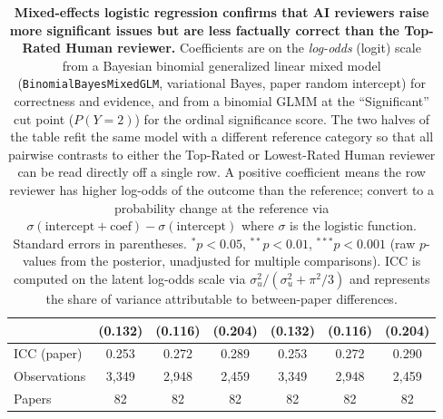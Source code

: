 \begin{table}[t]
\begin{tabular}{l ccc ccc}
                     & {\scriptsize (0.132)} & {\scriptsize (0.116)} & {\scriptsize (0.204)} & {\scriptsize (0.132)} & {\scriptsize (0.116)} & {\scriptsize (0.204)} \\
\midrule
ICC (paper)          & 0.253          & 0.272          & 0.289          & 0.253          & 0.272          & 0.290          \\
Observations         & 3{,}349        & 2{,}948        & 2{,}459        & 3{,}349        & 2{,}948        & 2{,}459        \\
Papers               & 82             & 82             & 82             & 82             & 82             & 82             \\
\bottomrule
\end{tabular}
\caption{\textbf{Mixed-effects logistic regression confirms that AI reviewers raise more significant issues but are less factually correct than the Top-Rated Human reviewer.}
Coefficients are on the \emph{log-odds} (logit) scale from a Bayesian binomial generalized linear mixed model (\texttt{BinomialBayesMixedGLM}, variational Bayes, paper random intercept) for correctness and evidence, and from a binomial GLMM at the ``Significant'' cut point ($P(Y = 2)$) for the ordinal significance score.
The two halves of the table refit the same model with a different reference category so that all pairwise contrasts to either the Top-Rated or Lowest-Rated Human reviewer can be read directly off a single row.
A positive coefficient means the row reviewer has higher log-odds of the outcome than the reference; convert to a probability change at the reference via $\sigma(\text{intercept}+\text{coef})-\sigma(\text{intercept})$ where $\sigma$ is the logistic function.
Standard errors in parentheses.
$^{*}p < 0.05$, $^{**}p < 0.01$, $^{***}p < 0.001$ (raw $p$-values from the posterior, unadjusted for multiple comparisons).
ICC is computed on the latent log-odds scale via $\sigma_u^2/(\sigma_u^2 + \pi^2/3)$ and represents the share of variance attributable to between-paper differences.
}
\label{tab:glmm}
\end{table}
